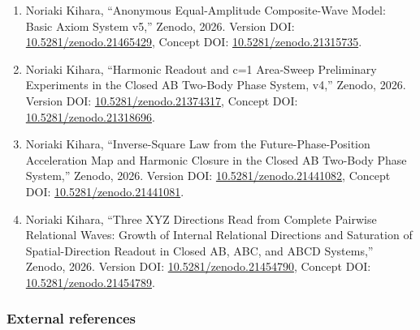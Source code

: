 \documentclass[
  a4paper,
]{article}
\providecommand{\tightlist}{%
  \setlength{\itemsep}{0pt}\setlength{\parskip}{0pt}}
\begin{document}
\begin{enumerate}
\def\labelenumi{\arabic{enumi}.}
\tightlist
\item
  Noriaki Kihara, ``Anonymous Equal-Amplitude Composite-Wave Model:
  Basic Axiom System v5,'' Zenodo, 2026. Version DOI:
  \href{https://doi.org/10.5281/zenodo.21465429}{10.5281/zenodo.21465429},
  Concept DOI:
  \href{https://doi.org/10.5281/zenodo.21315735}{10.5281/zenodo.21315735}.
\item
  Noriaki Kihara, ``Harmonic Readout and c=1 Area-Sweep Preliminary
  Experiments in the Closed AB Two-Body Phase System, v4,'' Zenodo,
  2026. Version DOI:
  \href{https://doi.org/10.5281/zenodo.21374317}{10.5281/zenodo.21374317},
  Concept DOI:
  \href{https://doi.org/10.5281/zenodo.21318696}{10.5281/zenodo.21318696}.
\item
  Noriaki Kihara, ``Inverse-Square Law from the Future-Phase-Position
  Acceleration Map and Harmonic Closure in the Closed AB Two-Body Phase
  System,'' Zenodo, 2026. Version DOI:
  \href{https://doi.org/10.5281/zenodo.21441082}{10.5281/zenodo.21441082},
  Concept DOI:
  \href{https://doi.org/10.5281/zenodo.21441081}{10.5281/zenodo.21441081}.
\item
  Noriaki Kihara, ``Three XYZ Directions Read from Complete Pairwise
  Relational Waves: Growth of Internal Relational Directions and
  Saturation of Spatial-Direction Readout in Closed AB, ABC, and ABCD
  Systems,'' Zenodo, 2026. Version DOI:
  \href{https://doi.org/10.5281/zenodo.21454790}{10.5281/zenodo.21454790},
  Concept DOI:
  \href{https://doi.org/10.5281/zenodo.21454789}{10.5281/zenodo.21454789}.
\end{enumerate}

\subsubsection{External references}\label{external-references}
\end{document}
